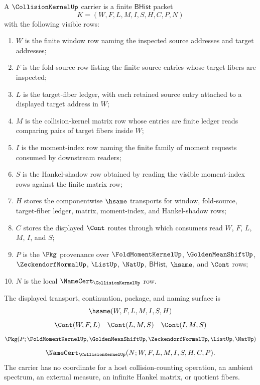 \begin{definition}
\label{def:collision-kernel-bhist-carrier}
A $\CollisionKernelUp$ carrier is a finite $\mathsf{BHist}$ packet
$$
K=(W,F,L,M,I,S,H,C,P,N)
$$
with the following visible rows:
\begin{enumerate}
\item $W$ is the finite window row naming the inspected source addresses and target addresses;
\item $F$ is the fold-source row listing the finite source entries whose target fibers are inspected;
\item $L$ is the target-fiber ledger, with each retained source entry attached to a displayed target address in $W$;
\item $M$ is the collision-kernel matrix row whose entries are finite ledger reads comparing pairs of target fibers inside $W$;
\item $I$ is the moment-index row naming the finite family of moment requests consumed by downstream readers;
\item $S$ is the Hankel-shadow row obtained by reading the visible moment-index rows against the finite matrix row;
\item $H$ stores the componentwise $\hsame$ transports for window, fold-source, target-fiber ledger, matrix, moment-index, and Hankel-shadow rows;
\item $C$ stores the displayed $\Cont$ routes through which consumers read $W$, $F$, $L$, $M$, $I$, and $S$;
\item $P$ is the $\Pkg$ provenance over $\FoldMomentKernelUp$, $\GoldenMeanShiftUp$, $\ZeckendorfNormalUp$, $\ListUp$, $\NatUp$, $\mathsf{BHist}$, $\hsame$, and $\Cont$ rows;
\item $N$ is the local $\NameCert_{\CollisionKernelUp}$ row.
\end{enumerate}
The displayed transport, continuation, package, and naming surface is
$$
\hsame(W,F,L,M,I,S,H)
$$
$$
\Cont(W,F,L)\quad \Cont(L,M,S)\quad \Cont(I,M,S)
$$
$$
\Pkg(P;\FoldMomentKernelUp,\GoldenMeanShiftUp,\ZeckendorfNormalUp,\ListUp,\NatUp)
$$
$$
\NameCert_{\CollisionKernelUp}(N;W,F,L,M,I,S,H,C,P).
$$
The carrier has no coordinate for a host collision-counting operation, an ambient spectrum, an external measure, an infinite Hankel matrix, or quotient fibers.
\end{definition}

